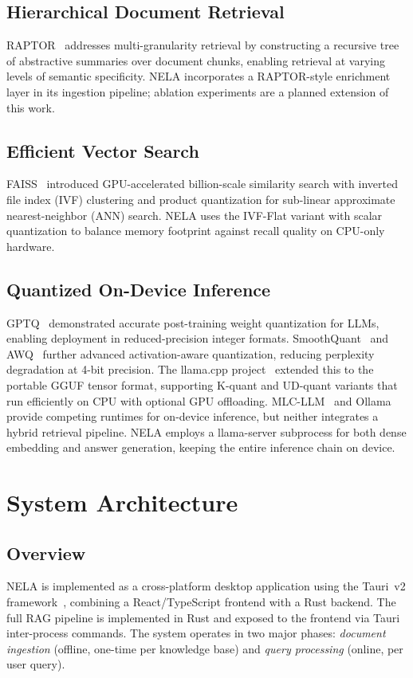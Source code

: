 \documentclass[conference]{IEEEtran}
\begin{document}
\subsection{Hierarchical Document Retrieval}
RAPTOR~\cite{b6} addresses multi-granularity retrieval by constructing a
recursive tree of abstractive summaries over document chunks, enabling
retrieval at varying levels of semantic specificity. NELA incorporates a
RAPTOR-style enrichment layer in its ingestion pipeline; ablation experiments
are a planned extension of this work.

\subsection{Efficient Vector Search}
FAISS~\cite{b7} introduced GPU-accelerated billion-scale similarity search
with inverted file index (IVF) clustering and product quantization for
sub-linear approximate nearest-neighbor (ANN) search. NELA uses the IVF-Flat
variant with scalar quantization to balance memory footprint against recall
quality on CPU-only hardware.

\subsection{Quantized On-Device Inference}
GPTQ~\cite{b8} demonstrated accurate post-training weight quantization for
LLMs, enabling deployment in reduced-precision integer formats. SmoothQuant~\cite{b24}
and AWQ~\cite{b25} further advanced activation-aware quantization, reducing
perplexity degradation at 4-bit precision. The llama.cpp project~\cite{b9}
extended this to the portable GGUF tensor format, supporting K-quant and
UD-quant variants that run efficiently on CPU with optional GPU offloading.
MLC-LLM~\cite{b26} and Ollama~\cite{b27} provide competing runtimes for
on-device inference, but neither integrates a hybrid retrieval pipeline.
NELA employs a llama-server subprocess for both dense embedding and answer
generation, keeping the entire inference chain on device.

\section{System Architecture}

\subsection{Overview}
NELA is implemented as a cross-platform desktop application using the
Tauri~v2 framework~\cite{b28}, combining a React/TypeScript frontend with a
Rust backend. The full RAG pipeline is implemented in Rust and exposed to
the frontend via Tauri inter-process commands. The system operates in two
major phases: \textit{document ingestion} (offline, one-time per knowledge
base) and \textit{query processing} (online, per user query).
\end{document}
